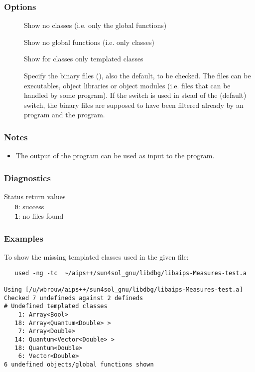 \subsubsection*{Options}

\begin{description}
\item[]
   Show no classes (i.e. only the global functions)
\item[]
   Show no global functions (i.e. only classes)
\item[]
   Show for classes only templated classes
\item[]
   Specify the binary files (), also the default, to be checked. The
   files can be executables, object libraries or object modules (i.e. files
   that can be handled by some  program). If the  switch is
   used in stead of the (default)  switch, the binary files are
   supposed to have been filtered already by an  program and the
    program.
\end{description}

\subsubsection*{Notes}

\begin{itemize}
\item
   The output of the program can be used as input to the 
   program. 
\end{itemize}

\subsubsection*{Diagnostics}

Status return values
\\ \verb+   0+: success
\\ \verb+   1+: no files found

\subsubsection*{Examples}

To show the missing templated classes used in the given file:

\begin{verbatim}
   used -ng -tc  ~/aips++/sun4sol_gnu/libdbg/libaips-Measures-test.a

Using [/u/wbrouw/aips++/sun4sol_gnu/libdbg/libaips-Measures-test.a]
Checked 7 undefineds against 2 defineds
# Undefined templated classes
    1: Array<Bool>
   18: Array<Quantum<Double> >
    7: Array<Double>
   14: Quantum<Vector<Double> >
   18: Quantum<Double>
    6: Vector<Double>
6 undefined objects/global functions shown
\end{verbatim}

